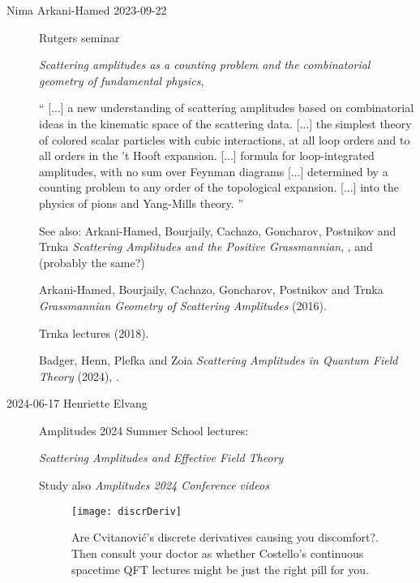 \begin{description}
\item[Nima Arkani-Hamed 2023-09-22]
{Rutgers seminar}

{\em Scattering amplitudes as a counting problem and
the combinatorial geometry of fundamental physics},

``
[...] a new understanding of scattering amplitudes based on
combinatorial ideas in the kinematic space of the scattering data.
[...] the simplest theory of colored scalar
particles with cubic interactions, at all loop orders and to all orders
in the 't Hooft expansion. [...] formula for
loop-integrated amplitudes, with no sum over
Feynman diagrams [...] determined by a counting
problem to any order of the topological expansion.
[...]  into the physics of pions and Yang-Mills theory.
''

See also:
Arkani-Hamed, Bourjaily, Cachazo, Goncharov, Postnikov and
Trnka %
  {\em Scattering Amplitudes and the Positive Grassmannian},
  ,
and (probably the same?)

Arkani-Hamed, Bourjaily, Cachazo, Goncharov, Postnikov and
Trnka
  {\em Grassmannian Geometry of Scattering Amplitudes} (2016).

Trnka 
{lectures} (2018).

Badger, Henn, Plefka and Zoia
{\em Scattering Amplitudes in Quantum Field Theory} (2024),
.

\item[2024-06-17 Henriette Elvang]
{Amplitudes 2024 Summer School} lectures:

{\em Scattering Amplitudes and Effective Field Theory}

Study also
{\em Amplitudes 2024 Conference}
{\em videos}




%
\begin{figure}
\begin{center}
\texttt{[image: discrDeriv]}
\end{center}
\caption{\label{f:discrDeriv}
Are Cvitanovi{\'c}'s discrete derivatives causing you discomfort?.
Then consult your doctor as whether
Costello's continuous spacetime QFT lectures might be just the right
pill for you.
}
 \end{figure}


\end{description}
